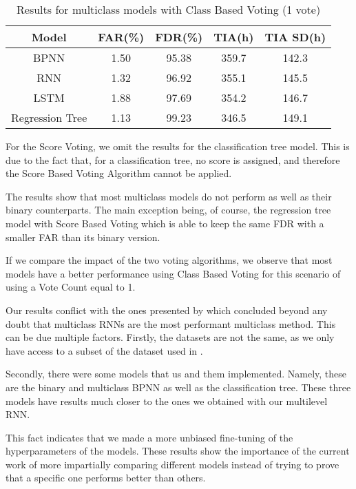 \begin{table}
  \begin{center}
    \begin{tabular}{|c|c|c|c|c|}
      \hline
    Model & FAR(\%) & FDR(\%) & TIA(h) & TIA SD(h) \\
    \hline
    BPNN & 1.50 & 95.38 & 359.7 & 142.3 \\
    RNN & 1.32 & 96.92 & 355.1 & 145.5 \\
    LSTM & 1.88 & 97.69 & 354.2 & 146.7 \\
    Regression Tree & 1.13 & 99.23 & 346.5 & 149.1 \\
    \hline
    \end{tabular}
    \caption[Results Multiclass Models, Class Voting, 1 vote]{Results for multiclass models with Class Based Voting (1 vote)}
    \label{table:results_multiclass_class_one_vote}
  \end{center}
\end{table}

For the Score Voting, we omit the results for the classification tree model.
This is due to the fact that, for a classification tree, no score is assigned, and therefore the Score Based Voting Algorithm cannot be applied.

The results show that most multiclass models do not perform as well as their binary counterparts.
The main exception being, of course, the regression tree model with Score Based Voting which is able to keep the same FDR with a smaller FAR than its binary version.

If we compare the impact of the two voting algorithms, we observe that most models have a better performance using Class Based Voting for this scenario of using a Vote Count equal to 1.

Our results conflict with the ones presented by \cite{Xu16} which concluded beyond any doubt that multiclass RNNs are the most performant multiclass method.
This can be due multiple factors.
Firstly, the datasets are not the same, as we only have access to a subset of the dataset used in \cite{Xu16}.

Secondly, there were some models that us and them implemented.
Namely, these are the binary and multiclass BPNN as well as the classification tree.
These three models have results much closer to the ones we obtained with our multilevel RNN.


This fact indicates that we made a more unbiased fine-tuning of the hyperparameters of the models.
These results show the importance of the current work of more impartially comparing different models instead of trying to prove that a specific one performs better than others.

